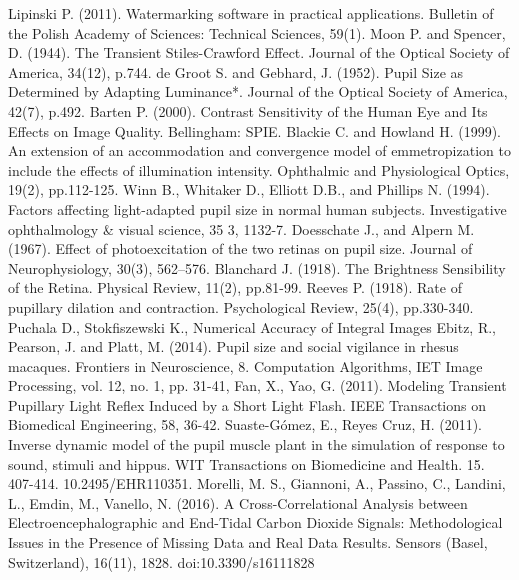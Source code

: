 \documentclass[USenglish,twocolumn]{article}
\begin{document}
\begin{thebibliography}{99}
Lipinski P. (2011). Watermarking software in practical applications. Bulletin of the Polish Academy of Sciences: Technical Sciences, 59(1).
Moon P. and Spencer, D. (1944). The Transient Stiles-Crawford Effect. Journal of the Optical Society of America, 34(12), p.744.
de Groot S. and Gebhard, J. (1952). Pupil Size as Determined by Adapting Luminance*. Journal of the Optical Society of America, 42(7), p.492.
Barten P. (2000). Contrast Sensitivity of the Human Eye and Its Effects on Image Quality. Bellingham: SPIE.
Blackie C. and Howland H. (1999). An extension of an accommodation and convergence model of emmetropization to include the effects of illumination intensity. Ophthalmic and Physiological Optics, 19(2), pp.112-125.
Winn B., Whitaker D., Elliott D.B., and Phillips N. (1994). Factors affecting light-adapted pupil size in normal human subjects. Investigative ophthalmology \& visual science, 35 3, 1132-7.
Doesschate J., and Alpern M. (1967). Effect of photoexcitation of the two retinas on pupil size. Journal of Neurophysiology, 30(3), 562–576.
Blanchard J. (1918). The Brightness Sensibility of the Retina. Physical Review, 11(2), pp.81-99.
Reeves P. (1918). Rate of pupillary dilation and contraction. Psychological Review, 25(4), pp.330-340.
Puchala D., Stokfiszewski K., Numerical Accuracy of Integral Images
Ebitz, R., Pearson, J. and Platt, M. (2014). Pupil size and social vigilance in rhesus macaques. Frontiers in Neuroscience, 8.
Computation Algorithms, IET Image Processing, vol. 12, no. 1, pp. 31-41,
Fan, X., Yao, G. (2011). Modeling Transient Pupillary Light Reflex Induced by a Short Light Flash. IEEE Transactions on Biomedical Engineering, 58, 36-42.
Suaste-Gómez, E., Reyes Cruz, H. (2011). Inverse dynamic model of the pupil muscle plant in the simulation of response to sound, stimuli and hippus. WIT Transactions on Biomedicine and Health. 15. 407-414. 10.2495/EHR110351. 
Morelli, M. S., Giannoni, A., Passino, C., Landini, L., Emdin, M., Vanello, N. (2016). A Cross-Correlational Analysis between Electroencephalographic and End-Tidal Carbon Dioxide Signals: Methodological Issues in the Presence of Missing Data and Real Data Results. Sensors (Basel, Switzerland), 16(11), 1828. doi:10.3390/s16111828
\end{thebibliography}
\end{document}
